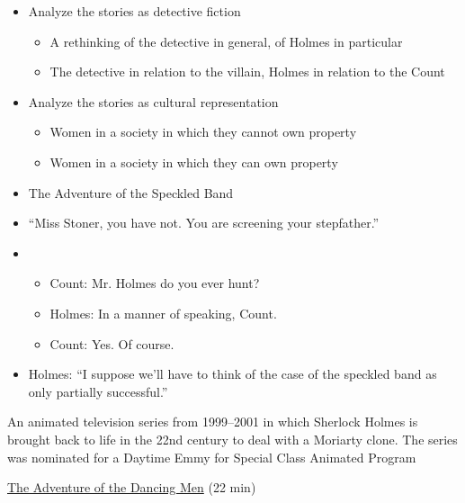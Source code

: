 \documentclass[a4paper,landscape,headrule,footrule,xetex]{foils}
\begin{document}
% 

\begin{itemize}
\item Analyze the stories as detective fiction
  \begin{itemize}
  \item A rethinking of the detective in general, of Holmes
in particular
\item The detective in relation to the villain, Holmes in
relation to the Count
\end{itemize}
\item Analyze the stories as cultural representation
  \begin{itemize}
  \item Women in a society in which they cannot own
property
\item Women in a society in which they can own
property
\end{itemize}
\end{itemize}


\begin{itemize}
\item The Adventure of the Speckled Band
\item “Miss Stoner, you have not. You are screening your
stepfather.”
\item 
  \begin{itemize}
  \item Count: Mr. Holmes do you ever hunt?
  \item Holmes: In a manner of speaking, Count.
  \item Count: Yes. Of course.
  \end{itemize}
\item Holmes: “I suppose we’ll have to think of the case
of the speckled band as only partially successful.”
\end{itemize}


An animated television series from 1999--2001 in which Sherlock Holmes
is brought back to life in the 22nd century to deal with a Moriarty
clone. The series was nominated for a Daytime Emmy for Special Class Animated Program

\href{https://www.youtube.com/watch?v=d9Eiy5FvYO0}{The Adventure of
  the Dancing Men} (22 min)
\end{document}

